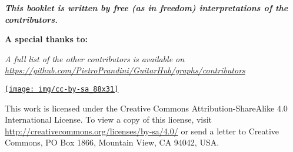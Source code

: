 %
%
%
%

\begin{center}
	{\textit{\textbf{This booklet is written by free (as in freedom) interpretations of the contributors.}}}\par
\end{center}
\begin{center}
	\textbf{A special thanks to:}
	
\end{center}
\begin{center}
	{\textit{\footnotesize{A full list of the other contributors is available on \href{https://github.com/PietroPrandini/GuitarHub/graphs/contributors}{https://github.com/PietroPrandini/GuitarHub/graphs/contributors}}}}\par
\end{center}
\begin{center}
	\href{http://creativecommons.org/licenses/by-sa/4.0/}{\texttt{[image: img/cc-by-sa\_88x31]}} \par
	{\footnotesize{This work is licensed under the Creative Commons Attribution-ShareAlike 4.0 International License. To view a copy of this license, visit \href{http://creativecommons.org/licenses/by-sa/4.0/}{http://creativecommons.org/licenses/by-sa/4.0/} or send a letter to Creative Commons, PO Box 1866, Mountain View, CA 94042, USA.}}\par
\medskip
{}
\end{center}
\newpage
